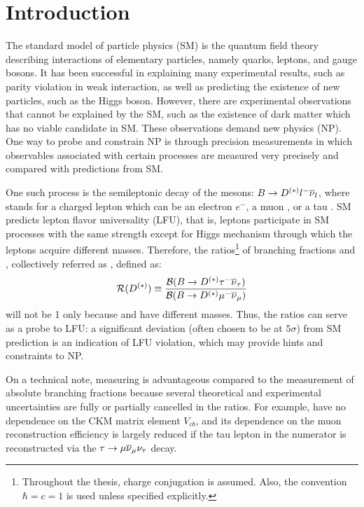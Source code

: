 \chapter{Introduction}
\label{ref:intro}

The standard model of particle physics (SM)
is the quantum field theory describing interactions of elementary particles,
namely quarks, leptons, and gauge bosons.
It has been successful in explaining many experimental results, such as parity
violation in weak interaction,
as well as predicting the existence of new particles, such as the Higgs boson.
However,
there are experimental observations that cannot be explained by the SM,
such as the existence of dark matter
which has no viable candidate in SM.
These observations demand new physics (NP).
One way to probe and constrain NP is through precision measurements
in which observables associated with certain processes are measured very
precisely and compared with predictions from SM.

One such process is the semileptonic decay of the \B mesons:
$B \rightarrow D^{(*)} {l^-} {{\overline{\nu}}_l}$,
where \ellm stands for a charged lepton which can be an electron $e^-$,
a muon \mun, or a tau \taum.
SM predicts lepton flavor universality (LFU),
that is, leptons participate in SM processes with the same strength
except for Higgs mechanism through which the leptons acquire different masses.
Therefore,
the ratios\footnote{
    Throughout the thesis, charge conjugation is assumed.
    Also, the convention $\hbar = c = 1$ is used unless specified explicitly.
} of branching fractions \RD and \RDst,
collectively referred as \RDX, defined as:
\begin{equation}
    \mathcal{R}(D^{(*)}) \equiv \frac{\mathcal{B}(B \rightarrow D^{(*)} {\tau^-} {{\overline{\nu}}_\tau})}{\mathcal{B}(B \rightarrow D^{(*)} {\mu^-} {{\overline{\nu}}_\mu})}
\end{equation}
will not be 1 only because \taum and \mun have different masses.
Thus, the ratios can serve as a probe to LFU:
a significant deviation (often chosen to be at $5\sigma$) from SM prediction is
an indication of LFU violation,
which may provide hints and constraints to NP.

On a technical note,
measuring \RDX is advantageous compared to the measurement of absolute branching
fractions because several theoretical and experimental uncertainties are fully
or partially cancelled in the ratios.
For example,
\RDX have no dependence on the CKM matrix element $V_{cb}$,
and its dependence on the muon reconstruction efficiency is largely reduced
if the tau lepton in the numerator is reconstructed via the
$\tau \rightarrow \mu {\ensuremath{{\overline{\nu}}_\mu}} {\ensuremath{{\nu}_\tau}}$ decay.

